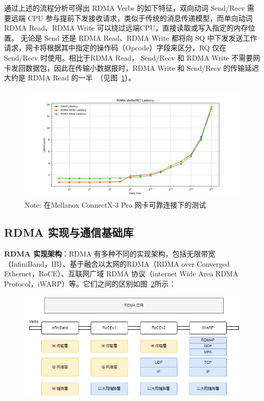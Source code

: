 {通过上述的流程分析可得出 RDMA Verbs 的如下特征，双向动词 Send/Recv 需要远端 CPU 参与提前下发接收请求，类似于传统的消息传递模型，而单向动词 RDMA Read、RDMA Write 可以绕过远端CPU，直接读取或写入指定的内存位置。
无论是 Send 还是 RDMA Read、RDMA Write 都将向 SQ 中下发发送工作请求，网卡将根据其中指定的操作码（Opcode）字段来区分，RQ 仅在 Send/Recv 时使用。相比于RDMA Read， Send/Recv 和 RDMA Write 不需要网卡发回数据包，因此在传输小数据报时，RDMA Write 和 Send/Recv 的传输延迟大约是 RDMA Read 的一半~\citep{kalia2014herd}（见图~\ref{fig:RDMA-Verbs-Latency}）。
\begin{figure}[!htbp]
    \centering
    \includegraphics[width=\linewidth]{Img/verbs-latency.png}
    {\small Note: 在Mellanox ConnectX-3 Pro 网卡可靠连接下的测试}
    \label{fig:RDMA-Verbs-Latency}
\end{figure}

\subsection{RDMA 实现与通信基础库}
\textbf{RDMA 实现架构}：RDMA 有多种不同的实现架构，包括无限带宽（InfiniBand，IB）、基于融合以太网的RDMA（RDMA over Converged Ethernet，RoCE）、互联网广域 RDMA 协议（internet Wide Area RDMA Protocol，iWARP）等。它们之间的区别如图~\ref{fig:RDMA-Implementations}所示：
\begin{figure}[!htbp]
    \centering
    \includegraphics[width=\linewidth]{Img/RDMA-Implementation.png}
    \label{fig:RDMA-Implementations}
\end{figure}

}
